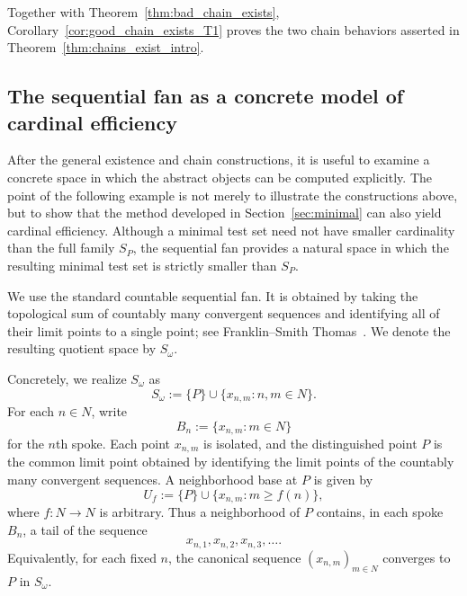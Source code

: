 \documentclass[11pt]{amsart}
\theoremstyle{plain}
\theoremstyle{definition}
\theoremstyle{remark}
\newcommand{\Sp}{\mathcal{S}_P}
\newcommand{\N}{\mathbb{N}}
\def\Sp{S_P}%
\def\N{N}%
\begin{document}
Together with Theorem~\ref{thm:bad_chain_exists}, Corollary~\ref{cor:good_chain_exists_T1} proves the two chain behaviors asserted in Theorem~\ref{thm:chains_exist_intro}.


\subsection{The sequential fan as a concrete model of cardinal efficiency}\label{subsec:sequential_fan}

After the general existence and chain constructions, it is useful to examine a concrete space in which the abstract objects can be computed explicitly.
The point of the following example is not merely to illustrate the constructions above, but to show that the method developed in Section~\ref{sec:minimal} can also yield cardinal efficiency.
Although a minimal test set need not have smaller cardinality than the full family $\Sp$, the sequential fan provides a natural space in which the resulting minimal test set is strictly smaller than $\Sp$.

We use the standard countable sequential fan.
It is obtained by taking the topological sum of countably many convergent sequences and identifying all of their limit points to a single point; see Franklin--Smith Thomas~\cite{FranklinSmithThomas1977}.
We denote the resulting quotient space by $S_\omega$.

Concretely, we realize $S_\omega$ as
\[
S_\omega:=\{P\}\cup\{x_{n,m}:n,m\in\N\}.
\]
For each $n\in\N$, write
\[
B_n:=\{x_{n,m}:m\in\N\}
\]
for the $n$th spoke.
Each point $x_{n,m}$ is isolated, and the distinguished point $P$ is the common limit point obtained by identifying the limit points of the countably many convergent sequences.
A neighborhood base at $P$ is given by
\[
U_f:=\{P\}\cup\{x_{n,m}:m\ge f(n)\},
\]
where $f:\N\to\N$ is arbitrary.
Thus a neighborhood of $P$ contains, in each spoke $B_n$, a tail of the sequence
\[
x_{n,1},x_{n,2},x_{n,3},\dots .
\]
Equivalently, for each fixed $n$, the canonical sequence $(x_{n,m})_{m\in\N}$ converges to $P$ in $S_\omega$.
\end{document}

